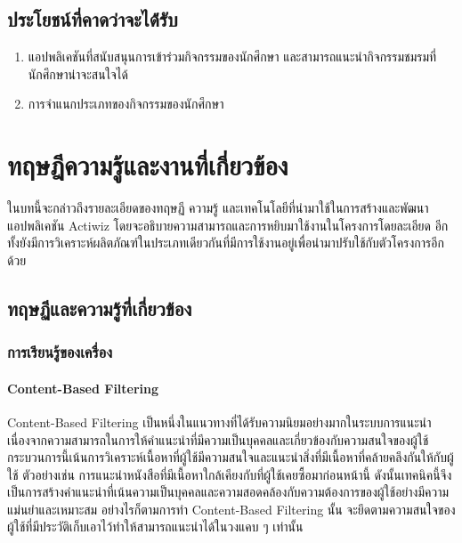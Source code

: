 \documentclass[14pt,oneside,openright,a4paper]{cpe-thai-project}
\begin{document}
\section{ประโยชน์ที่คาดว่าจะได้่รับ}
  \begin{enumerate}
    \item แอปพลิเคชันที่สนับสนุนการเข้าร่วมกิจกรรมของนักศึกษา และสามารถแนะนำกิจกรรมชมรมที่นักศึกษาน่าจะสนใจได้
    \item การจำแนกประเภทของกิจกรรมของนักศึกษา
  \end{enumerate}


\chapter{ทฤษฎีความรู้และงานที่เกี่ยวข้อง}
ในบทนี้จะกล่าวถึงรายละเอียดของทฤษฏี ความรู้ และเทคโนโลยีที่นำมาใช้ในการสร้างและพัฒนาแอปพลิเคชัน Actiwiz โดยจะอธิบายความสามารถและการหยิบมาใช้งานในโครงการโดยละเอียด อีกทั้งยังมีการวิเคราะห์ผลิตภัณฑ์ในประเภทเดียวกันที่มีการใช้งานอยู่เพื่อนำมาปรับใช้กับตัวโครงการอีกด้วย

\section{ทฤษฏีและความรู้ที่เกี่ยวข้อง}
  \subsection {การเรียนรู้ของเครื่อง}
    \subsubsection {Content-Based Filtering}
Content-Based Filtering \cite{Content-Based} เป็นหนึ่งในแนวทางที่ได้รับความนิยมอย่างมากในระบบการแนะนำ เนื่องจากความสามารถในการให้คำแนะนำที่มีความเป็นบุคคลและเกี่ยวข้องกับความสนใจของผู้ใช้ 
กระบวนการนี้เน้นการวิเคราะห์เนื้อหาที่ผู้ใช้มีความสนใจและแนะนำสิ่งที่มีเนื้อหาที่คล้ายคลึงกันให้กับผู้ใช้ ตัวอย่างเช่น การแนะนำหนังสือที่มีเนื้อหาใกล้เคียงกับที่ผู้ใช้เคยซื้อมาก่อนหน้านี้ 
ดังนั้นเทคนิคนี้จึงเป็นการสร้างคำแนะนำที่เน้นความเป็นบุคคลและความสอดคล้องกับความต้องการของผู้ใช้อย่างมีความแม่นยำและเหมาะสม 
อย่างไรก็ตามการทำ Content-Based Filtering นั้น จะยึดตามความสนใจของผู้ใช้ที่มีประวัติเก็บเอาไว้ทำให้สามารถแนะนำได้ในวงแคบ ๆ เท่านั้น
\end{document}
